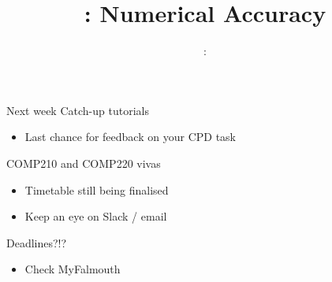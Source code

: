 \usepackage{../../beamerthemeFalmouthGamesAcademy}
\usepackage{multimedia}
\graphicspath{ {../../} }


\usepackage[normalem]{ulem}
\usepackage{wasysym}

\usepackage{pdfpages}

\usetikzlibrary{arrows,automata}




\title{\sessionnumber: Numerical Accuracy}
\subtitle{\modulecode: \moduletitle}

\frame{\titlepage} 


\begin{frame}{Next week}
	Catch-up tutorials
	\begin{itemize}
		\item Last chance for feedback on your CPD task
	\end{itemize}
	COMP210 and COMP220 vivas
	\begin{itemize}
		\item Timetable still being finalised
		\item Keep an eye on Slack / email
	\end{itemize}
	Deadlines?!?
	\begin{itemize}
		\item Check MyFalmouth
	\end{itemize}
\end{frame}





